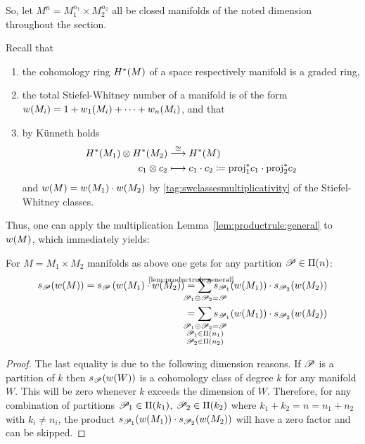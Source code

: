 So, let $M^n=M_1^{n_1}\times M_2^{n_2}$ all be closed manifolds of the
noted dimension throughout the section.

Recall that
\begin{enumerate}
\item the cohomology ring $H^*(M)$ of a space respectively
  manifold is a graded ring,
\item the total Stiefel-Whitney number of a manifold is of the form
  ${w}(M_i) = 1 + {w_{1}}(M_i) + \dotsb + {w_{n}}(M_i)$, and that
\item by Künneth holds
  \begin{align*}
    H^*(M_1)\otimes H^*(M_2)
    &\overset{\cong}{\longrightarrow} H^*(M)
    \\
    c_1 \otimes c_2
    &\longmapsto c_1\cdot c_2
      \coloneqq {\mathrm{proj}}^*_1 c_1 \cdot {\mathrm{proj}}^*_2 c_2
  \end{align*}
  and ${w}(M) = {w}(M_1) \cdot {w}(M_2)$ by
  \ref{tag:swclassesmultiplicativity} of the Stiefel-Whitney classes.
\end{enumerate}
Thus, one can apply the multiplication
Lemma~\autoref{lem:productrule:general} to ${w}(M)$, which immediately
yields:
\begin{Cor}\label{cor:productrule:swcl}
  For $M=M_1\times M_2$ manifolds as above one gets for any partition
  $\mathscr{P}\in\Pi({n})$:
  \begin{align*}
    \s{\Part}(\W{M})
    =
    \s{\Part}\left(\W{M_1}\cdot \W{M_2}\right)
    &\cequalsby{\autoref{lem:productrule:general}}
      \sum_{\mathclap{\Part_1\concat\Part_2=\Part}}
      \s{\Part_1}(\W{M_1}) \cdot \s{\Part_2}(\W{M_2})
    \\ &=
         \sum_{\mathclap{\substack{
         \Part_1\concat\Part_2=\Part\\
    \Part_1\in\PartitionsOf{n_1}\\
    \Part_2\in\PartitionsOf{n_2}\\
    }}}
    \s{\Part_1}(\W{M_1}) \cdot \s{\Part_2}(\W{M_2})
  \end{align*}
  \begin{proof}
    The last equality is due to the following dimension reasons.
    If $\mathscr{P}$ is a partition of $k$ then $s_{\mathscr{P}}({w}(W))$ is a
    cohomology class of degree $k$ for any manifold $W$.
    This will be zero whenever $k$ exceeds the dimension of $W$.
    Therefore, for any combination of partitions
    $\mathscr{P}_1\in\Pi({k_1})$,
    $\mathscr{P}_2\in\Pi({k_2})$
    where $k_1+k_2=n=n_1+n_2$ with $k_i\neq n_i$, the product
    $s_{\mathscr{P}_1}({w}(M_1))\cdot s_{\mathscr{P}_2}({w}(M_2))$ will have a zero
    factor and can be skipped.
  \end{proof}
\end{Cor}


